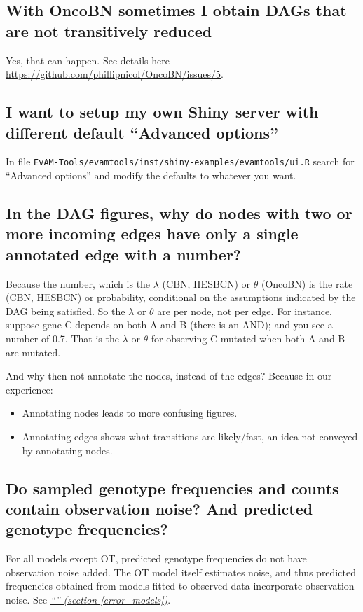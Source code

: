 \documentclass[a4paper,11pt]{article}
\newcommand*{\qref}[1]{\hyperref[{#1}]{\textit{``\nameref*{#1}'' (section \ref*{#1})}}}
\begin{document}
\subsection{With OncoBN sometimes I obtain DAGs that are not transitively reduced}

Yes, that can happen. See details here \url{https://github.com/phillipnicol/OncoBN/issues/5}.

\subsection{I want to setup my own Shiny server with different default ``Advanced options''}

In file \texttt{EvAM-Tools/evamtools/inst/shiny-examples/evamtools/ui.R} search for ``Advanced options'' and modify the defaults to whatever you want.


\subsection{In the DAG figures, why do nodes with two or more incoming edges have only a single annotated edge with a number?}
\label{faq-single-num}

Because the number, which is the $\lambda$ (CBN, HESBCN) or $\theta$ (OncoBN) is the rate (CBN, HESBCN) or probability, conditional on the assumptions indicated by the DAG being satisfied. So the $\lambda$ or $\theta$ are per node, not per edge. For instance, suppose gene C depends on both A and B (there is an AND); and you see a number of 0.7. That is the $\lambda$ or $\theta$ for observing C mutated when both A and B are mutated. 


And why then not annotate the nodes, instead of the edges? Because in our experience:
\begin{itemize}
\item Annotating nodes leads to more confusing figures.
\item Annotating edges shows what transitions are likely/fast, an idea not conveyed by annotating nodes.
\end{itemize}

\subsection{Do sampled genotype frequencies and counts contain observation noise? And predicted genotype frequencies?}
\label{sec:do-sampled-genotype}

For all models except OT, predicted genotype frequencies do not have observation noise added. The OT model itself estimates noise, and thus predicted frequencies obtained from models fitted to observed data incorporate observation noise. See \qref{error_models}.
\end{document}
